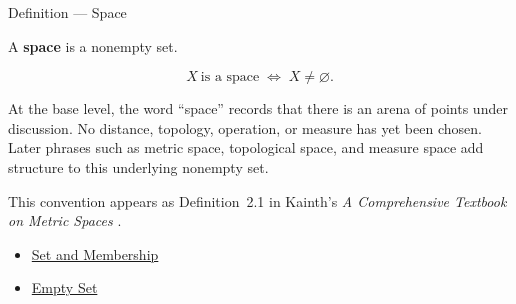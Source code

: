 \begin{definitionbox}{Definition --- Space}
\begin{definition}[Space]\label{def:mathematical-space}
A \textbf{space} is a nonempty set.
\end{definition}
\end{definitionbox}

\begin{remark*}
\[
  X\ \text{is a space}
  \;\Longleftrightarrow\;
  X \neq \varnothing.
\]
\end{remark*}

\begin{remark*}[Interpretation]
At the base level, the word ``space'' records that there is an arena of
points under discussion.  No distance, topology, operation, or measure has
yet been chosen.  Later phrases such as metric space, topological space, and
measure space add structure to this underlying nonempty set.
\end{remark*}

\begin{remark*}
This convention appears as Definition~2.1 in
Kainth's \emph{A Comprehensive Textbook on Metric Spaces}
\cite{KainthComprehensiveMetricSpaces2023}.
\end{remark*}

\begin{dependencies}
\begin{itemize}
  \item \hyperref[def:set-membership]{Set and Membership}
  \item \hyperref[def:empty-set]{Empty Set}
\end{itemize}
\end{dependencies}
